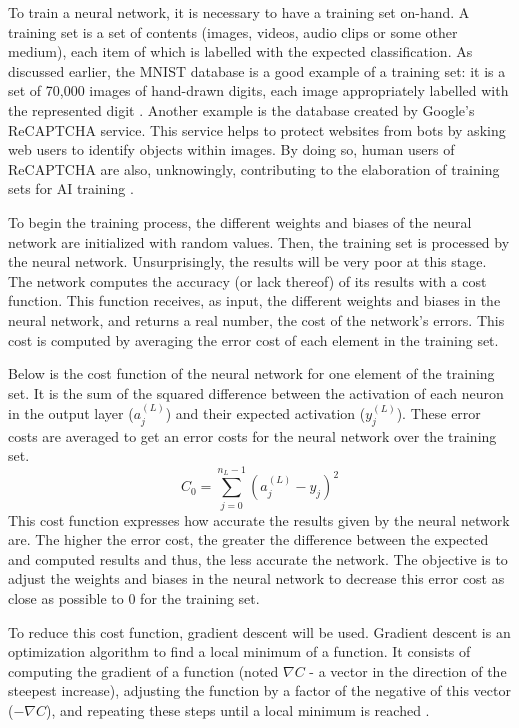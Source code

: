 \documentclass[12pt,a4paper,notitlepage]{article}
\begin{document}
To train a neural network, it is necessary to have a training set on-hand. A training set is a set of contents (images, videos, audio clips or some other medium), each item of which is labelled with the expected classification. As discussed earlier, the MNIST database is a good example of a training set: it is a set of 70,000 images of hand-drawn digits, each image appropriately labelled with the represented digit \cite{lecun_mnist_1998}. Another example is the database created by Google's ReCAPTCHA service. This service helps to protect websites from bots by asking web users to identify objects within images. By doing so, human users of ReCAPTCHA are also, unknowingly, contributing to the elaboration of training sets for AI training \cite{maruzani_are_2021}.

To begin the training process, the different weights and biases of the neural network are initialized with random values. Then, the training set is processed by the neural network. Unsurprisingly, the results will be very poor at this stage. The network computes the accuracy (or lack thereof) of its results with a cost function. This function receives, as input, the different weights and biases in the neural network, and returns a real number, the cost of the network's errors. This cost is computed by averaging the error cost of each element in the training set.

Below is the cost function of the neural network for one element of the training set. It is the sum of the squared difference between the activation of each neuron in the output layer (\(a_{j}^{(L)}\)) and their expected activation (\(y_{j}^{(L)}\)). These error costs are averaged to get an error costs for the neural network over the training set.
\begin{displaymath}
	C_{0} = \sum_{j=0}^{n_{L} - 1} (a_{j}^{(L)} - y_{j})^{2}
\end{displaymath}
This cost function expresses how accurate the results given by the neural network are. The higher the error cost, the greater the difference between the expected and computed results and thus, the less accurate the network. The objective is to adjust the weights and biases in the neural network to decrease this error cost as close as possible to 0 for the training set.

To reduce this cost function, gradient descent will be used. Gradient descent is an optimization algorithm to find a local minimum of a function. It consists of computing the gradient of a function (noted \(\nabla C\) - a vector in the direction of the steepest increase), adjusting the function by a factor of the negative of this vector (\(-\nabla C\)), and repeating these steps until a local minimum is reached \cite{sanderson_gradient_2017}.
\end{document}
